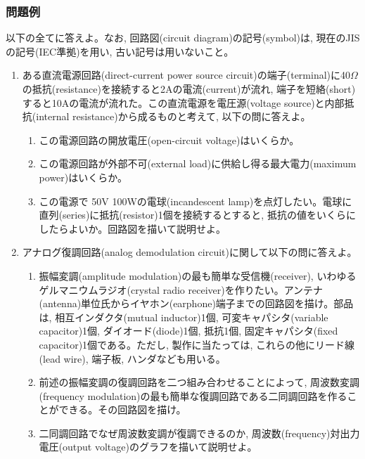 \documentclass[dvipdfmx,titlepage, 11pt, a4paper]{jsarticle}%
\begin{document}
\subsubsection{問題例}
以下の全てに答えよ。なお, 回路図(circuit diagram)の記号(symbol)は, 現在のJISの記号(IEC準拠)を用い, 古い記号は用いないこと。
\begin{enumerate}[(1)]
  \setlength{\itemsep}{15pt}
\item ある直流電源回路(direct-current power source circuit)の端子(terminal)に40$\Omega$の抵抗(resistance)を接続すると2Aの電流(current)が流れ, 端子を短絡(short)すると10Aの電流が流れた。この直流電源を電圧源(voltage source)と内部抵抗(internal resistance)から成るものと考えて, 以下の問に答えよ。
  \begin{enumerate}[(${1}-$a)]
    \setlength{\itemsep}{15pt}
  \item この電源回路の開放電圧(open-circuit voltage)はいくらか。
  \item この電源回路が外部不可(external load)に供給し得る最大電力(maximum power)はいくらか。
  \item この電源で 50V 100Wの電球(incandescent lamp)を点灯したい。電球に直列(series)に抵抗(resistor)1個を接続するとすると, 抵抗の値をいくらにしたらよいか。回路図を描いて説明せよ。
  \end{enumerate}
\item アナログ復調回路(analog demodulation circuit)に関して以下の問に答えよ。
  \begin{enumerate}[(${2}-$a)]
    \setlength{\itemsep}{15pt}
  \item 振幅変調(amplitude modulation)の最も簡単な受信機(receiver), いわゆるゲルマニウムラジオ(crystal radio receiver)を作りたい。アンテナ(antenna)単位氏からイヤホン(earphone)端子までの回路図を描け。部品は, 相互インダクタ(mutual inductor)1個, 可変キャパシタ(variable capacitor)1個, ダイオード(diode)1個, 抵抗1個, 固定キャパシタ(fixed capacitor)1個である。ただし, 製作に当たっては, これらの他にリード線(lead wire), 端子板, ハンダなども用いる。
  \item 前述の振幅変調の復調回路を二つ組み合わせることによって, 周波数変調(frequency modulation)の最も簡単な復調回路である二同調回路を作ることができる。その回路図を描け。
  \item 二同調回路でなぜ周波数変調が復調できるのか, 周波数(frequency)対出力電圧(output voltage)のグラフを描いて説明せよ。
  \end{enumerate}
\end{enumerate}
\newpage
\end{document}
